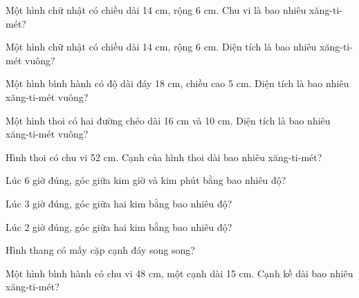 \begin{ex}
Một hình chữ nhật có chiều dài 14 cm, rộng 6 cm. Chu vi là bao nhiêu xăng-ti-mét?
\end{ex}

\begin{ex}
Một hình chữ nhật có chiều dài 14 cm, rộng 6 cm. Diện tích là bao nhiêu xăng-ti-mét vuông?
\end{ex}

\begin{ex}
Một hình bình hành có độ dài đáy 18 cm, chiều cao 5 cm. Diện tích là bao nhiêu xăng-ti-mét vuông?
\end{ex}

\begin{ex}
Một hình thoi có hai đường chéo dài 16 cm và 10 cm. Diện tích là bao nhiêu xăng-ti-mét vuông?
\end{ex}

\begin{ex}
Hình thoi có chu vi 52 cm. Cạnh của hình thoi dài bao nhiêu xăng-ti-mét?
\end{ex}

\begin{ex}
Lúc 6 giờ đúng, góc giữa kim giờ và kim phút bằng bao nhiêu độ?
\end{ex}

\begin{ex}
Lúc 3 giờ đúng, góc giữa hai kim bằng bao nhiêu độ?
\end{ex}

\begin{ex}
Lúc 2 giờ đúng, góc giữa hai kim bằng bao nhiêu độ?
\end{ex}

\begin{ex}
Hình thang có mấy cặp cạnh đáy song song?
\end{ex}

\begin{ex}
Một hình bình hành có chu vi 48 cm, một cạnh dài 15 cm. Cạnh kề dài bao nhiêu xăng-ti-mét?
\end{ex}

